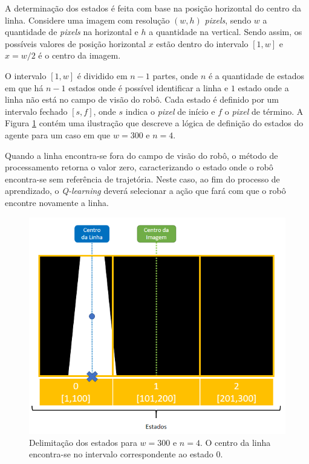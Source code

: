\documentclass[a4paper]{ifacconf}
\begin{document}
A determinação dos estados é feita com base na posição horizontal do centro da linha. Considere uma imagem com resolução $(w,h)$ \textit{pixels}, sendo $w$ a quantidade de \textit{pixels} na horizontal e $h$ a quantidade na vertical. Sendo assim, os possíveis valores de posição horizontal $x$ estão dentro do intervalo $[1,w]$ e $x = w/2$ é o centro da imagem. 

O intervalo $[1,w]$ é dividido em $n-1$ partes, onde $n$ é a quantidade de estados em que há $n-1$ estados onde é possível identificar a linha e $1$ estado onde a linha não está no campo de visão do robô. Cada estado é definido por um intervalo fechado $[s,f]$, onde $s$ indica o \textit{pixel} de início e $f$ o \textit{pixel} de término. A Figura \ref{fig:stateDefinitionSystem} contém uma ilustração que descreve a lógica de definição do estados do agente para um caso em que $w = 300$ e $n = 4$. 

Quando a linha encontra-se fora do campo de visão do robô, o método de processamento retorna o valor zero, caracterizando o estado onde o robô encontra-se sem referência de trajetória. Neste caso, ao fim do processo de aprendizado, o \textit{Q-learning} deverá selecionar a ação que fará com que o robô encontre novamente a linha. 

\begin{figure}
\centering
\includegraphics[scale=0.55]{Figuras/stateDefinitionSystem.png}
\caption{Delimitação dos estados para $w = 300$ e $n = 4$. O centro da linha encontra-se no intervalo correspondente ao estado 0.} 
\label{fig:stateDefinitionSystem}
\end{figure} 
\end{document}
